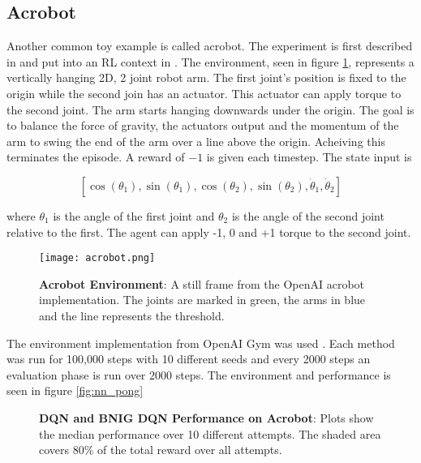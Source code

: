 \subsection{Acrobot}

Another common toy example is called acrobot. The experiment is first described in \cite{hauser_1990} and put into an RL context in \cite{sutton_1996}. The environment, seen in figure \ref{fig:acrobot}, represents a vertically hanging 2D, 2 joint robot arm. The first joint's position is fixed to the origin while the second join has an actuator. This actuator can apply torque to the second joint. The arm starts hanging downwards under the origin. The goal is to balance the force of gravity, the actuators output and the momentum of the arm to swing the end of the arm over a line above the origin. Acheiving this terminates the episode. A reward of $-1$ is given each timestep. The state input is

$$
[\cos(\theta_1), \sin(\theta_1), \cos(\theta_2), \sin(\theta_2), \dot{\theta}_1, \dot{\theta}_2]
$$

where $\theta_1$ is the angle of the first joint and $\theta_2$ is the angle of the second joint relative to the first. The agent can apply -1, 0 and +1 torque to the second joint.

\begin{figure}[H]
    \centering
    \texttt{[image: acrobot.png]}
    \caption{\textbf{Acrobot Environment}: A still frame from the OpenAI acrobot implementation. The joints are marked in green, the arms in blue and the line represents the threshold. \citep{gym_docs}}
    \label{fig:acrobot}
\end{figure}

The environment implementation from OpenAI Gym was used \citep{brockman_2016}. Each method was run for 100,000 steps with 10 different seeds and every 2000 steps an evaluation phase is run over 2000 steps. The environment and performance is seen in figure \ref{fig:nn_pong} 

\begin{figure}[H]
    \centering
    \caption{\textbf{DQN and BNIG DQN Performance on Acrobot}: Plots show the median performance over 10 different attempts. The shaded area covers 80\% of the total reward over all attempts.}
    \label{fig:nn_acrobot}
\end{figure}

